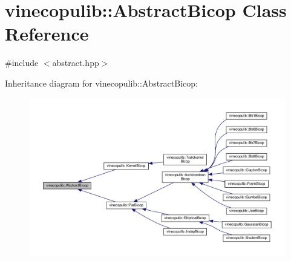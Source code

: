 \hypertarget{classvinecopulib_1_1_abstract_bicop}{}\section{vinecopulib\+:\+:Abstract\+Bicop Class Reference}
\label{classvinecopulib_1_1_abstract_bicop}


{\ttfamily \#include $<$abstract.\+hpp$>$}



Inheritance diagram for vinecopulib\+:\+:Abstract\+Bicop\+:\nopagebreak
\begin{figure}[H]
\begin{center}
\leavevmode
\includegraphics[width=350pt]{classvinecopulib_1_1_abstract_bicop__inherit__graph}
\end{center}
\end{figure}
